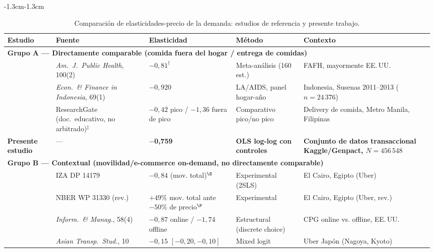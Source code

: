 \documentclass[doc, a4paper, biblatex, floatsintext, longtable, babel]{apa7}
\begin{document}
\begin{table}[!htbp]
\centering
\caption{Comparaci\'on de elasticidades-precio de la demanda: estudios de referencia y presente trabajo.}
\label{tab:comparacion_literatura}
\begin{adjustwidth}{-1.3cm}{-1.3cm}
\centering
\footnotesize
\begin{threeparttable}
\begin{tabular}{p{3.3cm} p{2.8cm} >{\centering\arraybackslash}p{2.5cm} p{2.0cm} p{3.2cm}}
\toprule
\textbf{Estudio} & \textbf{Fuente} & \textbf{Elasticidad} & \textbf{M\'etodo} & \textbf{Contexto} \\
\midrule
\multicolumn{5}{l}{\textbf{Grupo A --- Directamente comparable (comida fuera del hogar / entrega de comidas)}} \\
\midrule
\textcite{andreyeva2010} & \textit{Am.\ J.\ Public Health}, 100(2) & $-0,81^\dagger$ & Meta-an\'alisis (160 est.) & FAFH, mayormente EE.\,UU. \\
\textcite{damayanti2023} & \textit{Econ.\ \& Finance in Indonesia}, 69(1) & $-0,920$ & LA/AIDS, panel hogar-a\~no & Indonesia, Susenas 2011--2013 ($n=24\,376$) \\
\textcite{bumagat2025economics} & ResearchGate (doc.\ educativo, no arbitrado)$^{\ddagger}$ & $-0,42$ pico / $-1,36$ fuera de pico & Comparativo pico/no pico & Delivery de comida, Metro Manila, Filipinas \\
\textbf{Presente estudio} & --- & \textbf{$-$0,759} & \textbf{OLS log-log con controles} & \textbf{Conjunto de datos transaccional Kaggle/Genpact, $N=456\,548$} \\
\midrule
\multicolumn{5}{l}{\textbf{Grupo B --- Contextual (movilidad/e-commerce on-demand, no directamente comparable)}} \\
\midrule
\textcite{christensen2021} & IZA DP 14179 & $-0,84$ (mov. total)$^{\S}$ & Experimental (2SLS) & El Cairo, Egipto (Uber) \\
\textcite{christensen2023} & NBER WP 31330 (rev.) & $+49\%$ mov. total ante $-50\%$ de precio$^{\P}$ & Experimental & El Cairo, Egipto (Uber, rev.) \\
\textcite{zhang2021} & \textit{Inform.\ \& Manag.}, 58(4) & $-0,87$ online / $-1,74$ offline & Estructural (discrete choice) & CPG online vs. offline, EE.\,UU. \\
\textcite{sriwongphanawes2024} & \textit{Asian Transp.\ Stud.}, 10 & $-0,15$ $[-0,20,-0,10]$ & Mixed logit & Uber Jap\'on (Nagoya, Kyoto) \\
\bottomrule
\end{tabular}

\end{threeparttable}
\end{adjustwidth}
\end{table}
\end{document}
